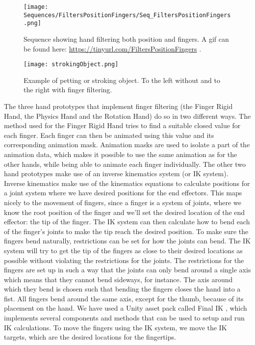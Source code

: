 \begin{figure}[H]
\centering
\texttt{[image: Sequences/FiltersPositionFingers/Seq\_FiltersPositionFingers.png]}
\caption{Sequence showing hand filtering both position and fingers. A gif can be found here: \url{https://tinyurl.com/FiltersPositionFingers} .}
\label{fig:filtersPositionFingers}
\end{figure}

\begin{figure}[H]
\centering
\texttt{[image: strokingObject.png]}
\caption{Example of petting or stroking object. To the left without and to the right with finger filtering.}
\label{fig:strokingFingerExample}
\end{figure}

The three hand prototypes that implement finger filtering (the Finger Rigid Hand, the Physics Hand and the Rotation Hand) do so in two different ways. The method used for the Finger Rigid Hand tries to find a suitable closed value for each finger. Each finger can then be animated using this value and its corresponding animation mask. Animation masks are used to isolate a part of the animation data, which makes it possible to use the same animation as for the other hands, while being able to animate each finger individually. The other two hand prototypes make use of an inverse kinematics system (or IK system). Inverse kinematics make use of the kinematics equations to calculate positions for a joint system where we have desired positions for the end effectors. This maps nicely to the movement of fingers, since a finger is a system of joints, where we know the root position of the finger and we'll set the desired location of the end effector: the tip of the finger. The IK system can then calculate how to bend each of the finger's joints to make the tip reach the desired position. To make sure the fingers bend naturally, restrictions can be set for how the joints can bend. The IK system will try to get the tip of the fingers as close to their desired locations as possible without violating the restrictions for the joints. The restrictions for the fingers are set up in such a way that the joints can only bend around a single axis which means that they cannot bend sideways, for instance. The axis around which they bend is chosen such that bending the fingers closes the hand into a fist. All fingers bend around the same axis, except for the thumb, because of its placement on the hand. We have used a Unity asset pack called Final IK \parencite{RootMotion2017}, which implements several components and methods that can be used to setup and run IK calculations. To move the fingers using the IK system, we move the IK targets, which are the desired locations for the fingertips.

